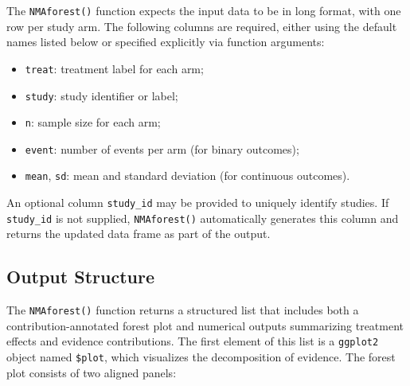 The \texttt{NMAforest()} function expects the input data to be in long format, with
one row per study arm. The following columns are required, either using the default
names listed below or specified explicitly via function arguments:

\begin{itemize}
  \item \texttt{treat}: treatment label for each arm;
  \item \texttt{study}: study identifier or label;
  \item \texttt{n}: sample size for each arm;
  \item \texttt{event}: number of events per arm (for binary outcomes);
  \item \texttt{mean}, \texttt{sd}: mean and standard deviation (for continuous outcomes).
\end{itemize}

An optional column \texttt{study\_id} may be provided to uniquely identify studies.
If \texttt{study\_id} is not supplied, \texttt{NMAforest()} automatically generates
this column and returns the updated data frame as part of the output.

\subsection{Output Structure}
The \texttt{NMAforest()} function returns a structured list that includes both a contribution-annotated forest plot and numerical outputs summarizing treatment effects and evidence contributions. The first element of this list is a \texttt{ggplot2} object named \texttt{\$plot}, which visualizes the decomposition of evidence. The forest plot consists of two aligned panels:

